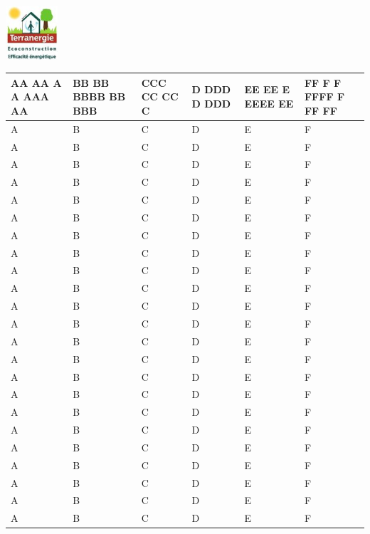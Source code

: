 
\begin{center}
\includegraphics[height=2cm]{Ecolline_Terranergie_Logo}
\end{center}

\begin{center}
\tiny
\begin{tabularx}{\textwidth}{|p{1cm}|p{2cm}|l|p{1cm}|p{2cm}|X|}
\hline
   AA AA A A AAA AA & BB BB BBBB BB BBB & CCC CC CC C & D DDD D DDD & EE EE E EEEE EE & FF F F FFFF F FF FF \\
\hline
   A & B & C & D & E & F \\
\hline
   A & B & C & D & E & F \\
\hline
   A & B & C & D & E & F \\
\hline
   A & B & C & D & E & F \\
\hline
   A & B & C & D & E & F \\
\hline
   A & B & C & D & E & F \\
\hline
   A & B & C & D & E & F \\
\hline
   A & B & C & D & E & F \\
\hline
   A & B & C & D & E & F \\
\hline
   A & B & C & D & E & F \\
\hline
   A & B & C & D & E & F \\
\hline
   A & B & C & D & E & F \\
\hline
   A & B & C & D & E & F \\
\hline
   A & B & C & D & E & F \\
\hline
   A & B & C & D & E & F \\
\hline
   A & B & C & D & E & F \\
\hline
   A & B & C & D & E & F \\
\hline
   A & B & C & D & E & F \\
\hline
   A & B & C & D & E & F \\
\hline
   A & B & C & D & E & F \\
\hline
   A & B & C & D & E & F \\
\hline
   A & B & C & D & E & F \\
\hline
   A & B & C & D & E & F \\
\hline
\end{tabularx}
\end{center}

\newpage
